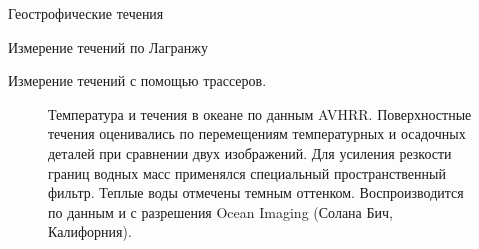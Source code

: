 \begin{chapter}{Геострофические течения}
\begin{section}{Измерение течений по Лагранжу}
\begin{paragraph}{Измерение течений с помощью трассеров.}
\begin{figure}[t!]
\caption{Температура и течения в океане по данным AVHRR. 
Поверхностные течения оценивались по перемещениям
температурных и осадочных деталей при сравнении двух
изображений. Для усиления резкости границ водных масс применялся специальный 
пространственный фильтр. Теплые воды отмечены темным оттенком. 
Воспроизводится по данным и с разрешения Ocean Imaging (Солана Бич, Калифорния).}
\label{Fig10.16.bw}
\end{figure}
%


\end{paragraph}
\end{section}
\end{chapter}

